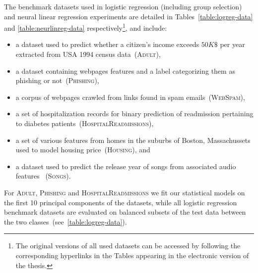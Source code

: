 The benchmark datasets used in logistic regression (including group selection) and neural linear regression experiments are detailed in Tables~\ref{table:logreg-data} and \ref{table:neurlinreg-data} respectively\footnote{The original versions of all used datasets can be accessed by following the corresponding hyperlinks in the Tables appearing in the electronic version of the thesis.}, and include: 
\begin{itemize}
	\item a dataset used to predict whether a citizen's income exceeds $50K \$$ per year extracted from USA 1994 census data~(\textsc{Adult}),
	\item a dataset containing webpages features and a label categorizing them as phishing or not~(\textsc{Phishing}),
	\item a corpus of webpages crawled from links found in spam emails~(\textsc{WebSpam}),
	\item a set of hospitalization records for binary prediction of readmission pertaining to diabetes patients~(\textsc{HospitalReadmissions}),
	\item a set of various features from homes in the suburbs of Boston, Massachussets used to model housing price~(\textsc{Housing}), and
	\item a dataset used to predict the release year of songs from associated audio features ~(\textsc{Songs}).
\end{itemize} 

For \textsc{Adult}, \textsc{Phishing} and \textsc{HospitalReadmissions} we fit our statistical models on the first 10 principal components of the datasets, while  all logistic regression benchmark datasets are evaluated on balanced subsets of the test data between the two classes~(see~\cref{table:logreg-data}).

